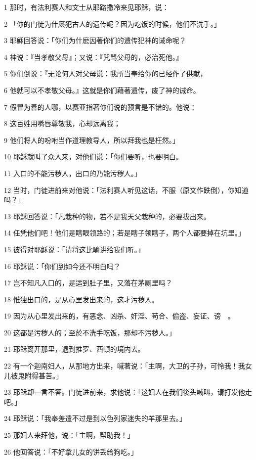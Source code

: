 \par 1 那时，有法利赛人和文士从耶路撒冷来见耶稣，说：
\par 2 「你的门徒为什麽犯古人的遗传呢？因为吃饭的时候，他们不洗手。」
\par 3 耶稣回答说：「你们为什麽因著你们的遗传犯神的诫命呢？
\par 4 神说：『当孝敬父母』；又说：『咒骂父母的，必治死他。』
\par 5 你们倒说：『无论何人对父母说：我所当奉给你的已经作了供献，
\par 6 他就可以不孝敬父母。』这就是你们藉著遗传，废了神的诫命。
\par 7 假冒为善的人哪，以赛亚指著你们说的预言是不错的。他说：
\par 8 这百姓用嘴唇尊敬我，心却远离我；
\par 9 他们将人的吩咐当作道理教导人，所以拜我也是枉然。」
\par 10 耶稣就叫了众人来，对他们说：「你们要听，也要明白。
\par 11 入口的不能污秽人，出口的乃能污秽人。」
\par 12 当时，门徒进前来对他说：「法利赛人听见这话，不服（原文作跌倒），你知道吗？」
\par 13 耶稣回答说：「凡栽种的物，若不是我天父栽种的，必要拔出来。
\par 14 任凭他们吧！他们是瞎眼领路的；若是瞎子领瞎子，两个人都要掉在坑里。」
\par 15 彼得对耶稣说：「请将这比喻讲给我们听。」
\par 16 耶稣说：「你们到如今还不明白吗？
\par 17 岂不知凡入口的，是运到肚子里，又落在茅厕里吗？
\par 18 惟独出口的，是从心里发出来的，这才污秽人。
\par 19 因为从心里发出来的，有恶念、凶杀、奸淫、苟合、偷盗、妄证、谤　。
\par 20 这都是污秽人的；至於不洗手吃饭，那却不污秽人。」
\par 21 耶稣离开那里，退到推罗、西顿的境内去。
\par 22 有一个迦南妇人，从那地方出来，喊著说：「主啊，大卫的子孙，可怜我！我女儿被鬼附得甚苦。」
\par 23 耶稣却一言不答。门徒进前来，求他说：「这妇人在我们後头喊叫，请打发他走吧。」
\par 24 耶稣说：「我奉差遣不过是到以色列家迷失的羊那里去。」
\par 25 那妇人来拜他，说：「主啊，帮助我！」
\par 26 他回答说：「不好拿儿女的饼丢给狗吃。」
